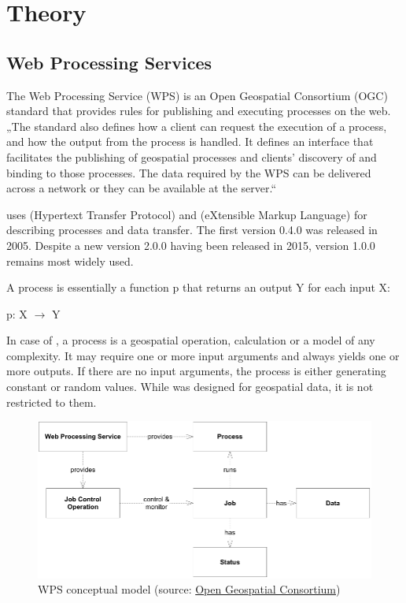 \chapter{Theory}
\label{2-teorie}

\section{Web Processing Services}

The Web Processing Service (WPS) is an Open Geospatial
Consortium (OGC) standard that provides rules for publishing and
executing processes on the web. „The standard also defines how a
client can request the execution of a process, and how the output from
the process is handled. It defines an interface that facilitates the
publishing of geospatial processes and clients’ discovery of and
binding to those processes. The data required by the WPS can be
delivered across a network or they can be available at the server.“
\cite{wpsstandard}


 uses  (Hypertext Transfer Protocol) and  (eXtensible Markup Language) for describing
processes and data transfer. The first version 0.4.0 was released in
2005. Despite a new version 2.0.0 having been released in 2015,
version 1.0.0 remains most widely used.

A process is essentially a function p that returns an output Y for
each input X:\\ \centerline{p: X $\rightarrow$ Y}

In case of , a process is a geospatial operation, calculation or a
model of any complexity. It may require one or more input arguments
and always yields one or more outputs. If there are no input
arguments, the process is either generating constant or random
values. While  was designed for geospatial data, it is not
restricted to them.

\begin{figure}[H] \centering
  \includegraphics[width=400pt]{./pictures/wps_conceptual_model.png}
      \caption[QGIS logo]{WPS conceptual model (source: \href{http://docs.opengeospatial.org/is/14-065/14-065.html\#10}{Open Geospatial Consortium})}
      \label{fig:WPS}
  \end{figure}

